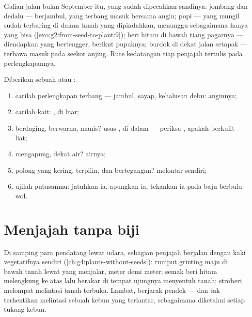 \begin{example}\label{ex:g6:how-plants-spread:roadside}
Galian jalan bulan September itu, yang sudah dipecahkan sandinya:
jombang dan dedalu ---  berjambul, yang terbang masuk bersama
angin;  popi ---  yang mungil sudah terbaring di dalam
tanah yang dipindahkan, menunggu sebagaimana hanya  yang bisa
(\cref{exo:g2:from-seed-to-plant:9});  beri hitam di bawah
tiang pagarnya --- diendapkan  yang bertengger, berikut pupuknya;
burdok di dekat jalan setapak --- terbawa masuk pada seekor anjing.
Rute kedatangan tiap penjajah tertulis pada perlengkapannya.
\end{example}

\begin{method}\label{met:g6:how-plants-spread:name}
Diberikan sebuah  atau :
\begin{enumerate}
  \item carilah perlengkapan terbang --- jambul, sayap, kehalusan
        debu: anginnya;
  \item carilah kait:  , di luar;
  \item berdaging, berwarna, manis? usus , di dalam --- periksa
        , apakah berkulit liat;
  \item mengapung, dekat air? airnya;
  \item polong yang kering, terpilin, dan bertegangan? melontar
        sendiri;
  \item ujilah putusanmu: jatuhkan ia, apungkan ia, tekankan ia pada
         baju berbulu wol.
\end{enumerate}
\end{method}

\section{Menjajah tanpa biji}

\begin{example}\label{ex:g6:how-plants-spread:vegetative}
Di samping para pendatang lewat udara, sebagian penjajah berjalan
dengan kaki vegetatifnya sendiri
(\cref{ch:g4:plants-without-seeds}): rumput grinting maju di bawah
tanah lewat  yang menjalar, meter demi meter; semak beri hitam
melengkung ke atas lalu berakar di tempat ujungnya menyentuh tanah;
 stroberi melompat melintasi tanah terbuka. Lambat, berjarak
pendek --- dan tak terhentikan melintasi sebuah kebun yang
terlantar, sebagaimana diketahui setiap tukang kebun.
\end{example}

